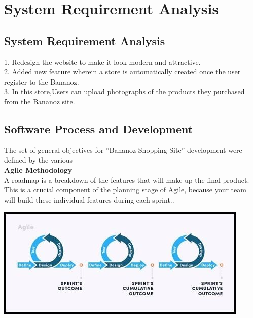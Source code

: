 \chapter{System Requirement Analysis}


\section{System Requirement Analysis}
1. Redesign the website to make it look modern and attractive.\\
2. Added new feature wherein a store is automatically created once the user register to the Bananoz.\\
3. In this store,Users can upload photographs of the products they purchased from the Bananoz site.\\







\section{Software Process and Development}
The set of general objectives for ”Bananoz Shopping Site” development were defined by the various\\
\textbf{Agile Methodology}\\

A roadmap is a breakdown of the features that will make up the final product.
This is a crucial component of the planning stage of Agile, because your team will
build these individual features during each sprint..


\includegraphics[scale=1.0]{Ch2/agile.jpg}

